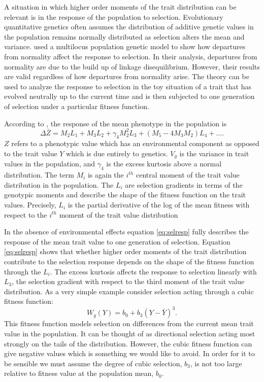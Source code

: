 A situation in which higher order moments of the trait distribution can be
relevant is in the response of the population to selection. Evolutionary
quantitative genetics often assumes the distribution of additive genetic values
in the population remains normally distributed as selection alters the mean and
variance. \citet{Turelli1990} used a multilocus population genetic model to show
how departures from normality affect the response to selection. In their
analysis, departures from normality are due to the build up of linkage
disequilibrium. However, their results are valid regardless of how departures
from normality arise. The \citet{Turelli1990} theory can be used to analyze the
response to selection in the toy situation of a trait that has evolved neutrally
up to the current time and is then subjected to one generation of selection
under a particular fitness function.

According to \citet{Turelli1990}, the response of the mean phenotype in the
population is
\begin{equation}
  \label{eq:selresp}
  \Delta \bar{Z} = M_2L_1 + M_3L_2 + \gamma_4M^2_2L_3 +
  \left( M_5-4M_3M_2\right)L_4 + \ldots.
\end{equation}
$Z$ refers to a phenotypic value which has an environmental component as opposed
to the trait value $Y$ which is due entirely to genetics. $V_g$ is the variance
in trait values in the population, and $\gamma_4$ is the excess kurtosis above a
normal distribution. The term $M_i$ is again the $i^{th}$ central moment of the
trait value distribution in the population. The $L_i$ are selection gradients in
terms of the genotypic moments and describe the shape of the fitness function on
the trait values. Precisely, $L_i$ is the partial derivative of the log of the
mean fitness with respect to the $i^{th}$ moment of the trait value distribution

In the absence of environmental effects equation \eqref{eq:selresp} fully
describes the response of the mean trait value to one generation of selection.
Equation \eqref{eq:selresp} shows that whether higher order moments of the trait
distribution contribute to the selection response depends on the shape of the
fitness function through the $L_i$. The excess kurtosis affects the response to
selection linearly with $L_3$, the selection gradient with respect to the third
moment of the trait value distribution. As a very simple example consider
selection acting through a cubic fitness function:
\begin{equation}
  \label{eq:cubsel}
  W_g(Y) = b_0 + b_3(Y-\bar{Y})^3.
\end{equation}
This fitness function models selection on differences from the current mean
trait value in the population. It can be thought of as directional selection
acting most strongly on the tails of the distribution. However, the cubic
fitness function can give negative values which is something we would like to
avoid. In order for it to be sensible we must assume the degree of cubic
selection, $b_3$, is not too large relative to fitness value at the population
mean, $b_0$.

